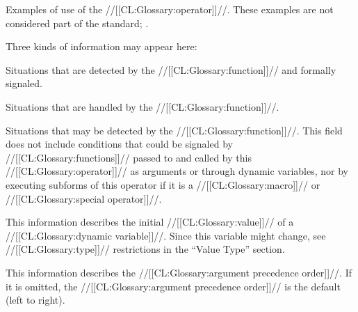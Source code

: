 
Examples of use of the //[[CL:Glossary:operator]]//.
These examples are not considered part of the standard;
\seesection\RemovableText.

\endsubsubsection%


  Three kinds of information may appear here:
\beginlist
\item{\bull}
Situations that are detected by the //[[CL:Glossary:function]]// and formally signaled.
\item{\bull}
Situations that are handled by the //[[CL:Glossary:function]]//.
\item{\bull}
Situations that may be detected by the //[[CL:Glossary:function]]//.
\endlist
This field does not include conditions that could
be signaled by //[[CL:Glossary:functions]]// passed to and called by this //[[CL:Glossary:operator]]//
as arguments or through dynamic variables, nor by executing subforms of this
operator if it is a //[[CL:Glossary:macro]]// or //[[CL:Glossary:special operator]]//.

\endsubsubsection%


This information describes the initial //[[CL:Glossary:value]]// of a //[[CL:Glossary:dynamic variable]]//.
Since this variable might change, see //[[CL:Glossary:type]]// restrictions in the ``Value Type'' section.

\endsubsubsection%




This information describes the //[[CL:Glossary:argument precedence order]]//.
If it is omitted, the //[[CL:Glossary:argument precedence order]]// is the default (left to right).

\endsubsubsection%



